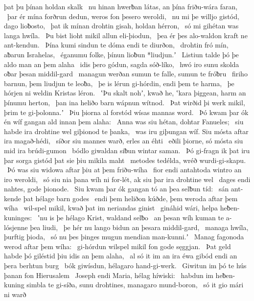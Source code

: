 þat þu þínan holdan skalk \hld\ nu hinan hwerƀan látas,
an þína friðu-wára faran, \hld\ þar ér mína forðrun dedun,
weros fon þesero weroldi, \hld\ nu mi þe willjo gistód,
dago lioƀosto, \hld\ þat ik mínan drohtin gisah,
holdan hérron, \hld\ só mi gihétan was
langa hwíla. \hld\ Þu bist lioht mikil
allun eli-þiodun, \hld\ þea ér þes alo-waldon
kraft ne ant-kendun. \hld\ Þína kumi sindun
te dóma endi te diurðon, \hld\ drohtin fró mín,
aƀarun Israhelas, \hld\ éganumu folke,
þínun lioƀun *liudjun.ʼ \hld\ Listiun talde þó
þe aldo man an þem alaha \hld\ idis þero gódun,
sagda sóð-líko, \hld\ hwó iro sunu skolda
oƀar þesan middil-gard \hld\ managun werðan
sumun te falle, sumun te fróƀru \hld\ firiho barnun,
þem liudjun te leoƀa, \hld\ þe is lérun gi-hórdin,
endi þem te harma, \hld\ þe hórjen ni weldin
Kristas léron. \hld\ ʽÞu skalt nohʼ, kwað he, ʽkara þiggean,
harm an þínumu herton, \hld\ þan ina heliðo barn
wápnun wítnod. \hld\ Þat wirðid þi werk mikil,
þrim te gi-þolonna.ʼ \hld\ Þiu þiorna al forstód
wísas mannas word. \hld\ Þó kwam þar ók én wíf gangan
ald innan þem alaha: \hld\ Anna was siu hétan,
dohtar Fanueles; \hld\ siu habde ira drohtine wel
giþionod te þanka, \hld\ was iru giþungan wíf.
Siu mósta aftar ira magað-hédi, \hld\ síðor siu mannes warð,
erles an éhti \hld\ eðili þiorne,
só mósta siu mid ira brúdi-gumon \hld\ bódlo giwaldan
siƀun wintar saman. \hld\ Þó gi-fragn ik þat iru þar sorga gistód
þat sie þiu mikila maht \hld\ metodes tedélda,
wréð wurdi-gi-skapu. \hld\ Þó was siu widowa aftar þiu
at þem friðu-wíha \hld\ fior endi antahtoda
wintro an iro weroldi, \hld\ só siu nia þana wíh ni for-lét,
ak siu þar ira drohtine wel \hld\ dages endi nahtes,
gode þionode. \hld\ Siu kwam þar ók gangan tó
an þea selƀun tíd: \hld\ sán ant-kende
þat hélage barn godes \hld\ endi þem heliðon kúðde,
þem weroda aftar þem wíha \hld\ wil-spel mikil,
kwað þat im neriandas ginist \hld\ gináhid wári,
helpa heƀen-kuninges: \hld\ ʽnu is þe hélago Krist,
waldand selƀo \hld\ an þesan wíh kuman
te a-lósjenne þea liudi, \hld\ þe hér nu lango bidun
an þesara middil-gard, \hld\ managa hwíla,
þurftig þioda, \hld\ só nu þes þinges mugun
mendian man-kunni.ʼ \hld\ Manag fagonoda
werod aftar þem wíha: \hld\ gi-hórdun wilspel mikil
fon gode sęggjan. \hld\ Þat geld habde þó giléstid
þiu idis an þem alaha, \hld\ al só it im an ira éwa gibód
endi an þera berhtun burg \hld\ bók giwísdun,
hélagaro hand-gi-werk. \hld\ Giwitun im þó te hús þanan
fon Hierusalem \hld\ Joseph endi Maria,
hélag híwiski: \hld\ habdun im heƀen-kuning
simbla te gi-síða, sunu drohtines,
managaro mund-boron, \hld\ só it gio mári ni warð
